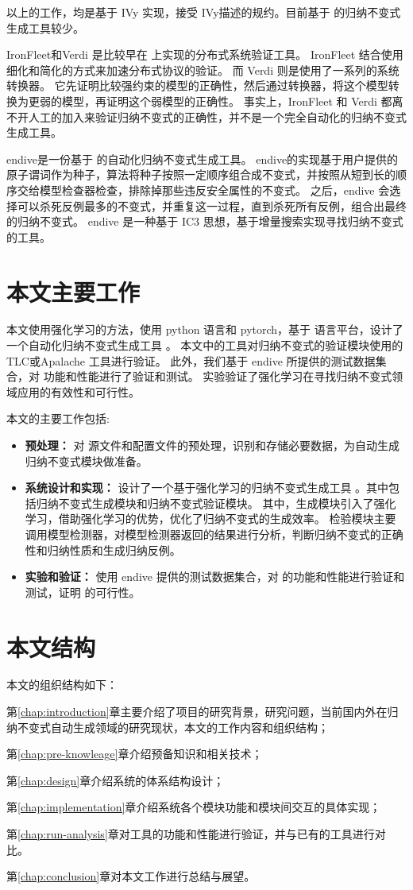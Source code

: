 以上的工作，均是基于 IVy 实现，接受 IVy描述的规约。目前基于 \TLA 的归纳不变式生成工具较少。

IronFleet\cite{IronFleet}和Verdi\cite{Verdi} 是比较早在 \TLA 上实现的分布式系统验证工具。
IronFleet 结合使用细化和简化的方式来加速分布式协议的验证。
而 Verdi 则是使用了一系列的系统转换器。
它先证明比较强约束的模型的正确性，然后通过转换器，将这个模型转换为更弱的模型，再证明这个弱模型的正确性。
事实上，IronFleet 和 Verdi 都离不开人工的加入来验证归纳不变式的正确性，并不是一个完全自动化的归纳不变式生成工具。

endive\cite{endive}是一份基于 \TLA 的自动化归纳不变式生成工具。
endive的实现基于用户提供的原子谓词作为种子，算法将种子按照一定顺序组合成不变式，并按照从短到长的顺序交给模型检查器检查，排除掉那些违反安全属性的不变式。
之后，endive 会选择可以杀死反例最多的不变式，并重复这一过程，直到杀死所有反例，组合出最终的归纳不变式。
endive 是一种基于 IC3 思想，基于增量搜索实现寻找归纳不变式的工具。

\section{本文主要工作}

本文使用强化学习的方法，使用 python 语言和 pytorch，基于 \TLA 语言平台，设计了一个自动化归纳不变式生成工具 \rltla。
本文中的工具对归纳不变式的验证模块使用的 TLC或Apalache 工具进行验证。
此外，我们基于 endive 所提供的测试数据集合，对 \rltla 功能和性能进行了验证和测试。
实验验证了强化学习在寻找归纳不变式领域应用的有效性和可行性。

本文的主要工作包括:
\begin{itemize}
    \item \textbf{预处理：} 对 \TLA 源文件和配置文件的预处理，识别和存储必要数据，为自动生成归纳不变式模块做准备。
    \item \textbf{系统设计和实现：} 设计了一个基于强化学习的归纳不变式生成工具 \rltla。其中包括归纳不变式生成模块和归纳不变式验证模块。
    其中，生成模块引入了强化学习，借助强化学习的优势，优化了归纳不变式的生成效率。
    检验模块主要调用模型检测器，对模型检测器返回的结果进行分析，判断归纳不变式的正确性和归纳性质和生成归纳反例。
    \item \textbf{实验和验证：} 使用 endive 提供的测试数据集合，对 \rltla 的功能和性能进行验证和测试，证明 \rltla 的可行性。
\end{itemize}

\section{本文结构}
本文的组织结构如下：

第\ref{chap:introduction}章主要介绍了项目的研究背景，研究问题，当前国内外在归纳不变式自动生成领域的研究现状，本文的工作内容和组织结构；

第\ref{chap:pre-knowleage}章介绍预备知识和相关技术；

第\ref{chap:design}章介绍系统的体系结构设计；

第\ref{chap:implementation}章介绍系统各个模块功能和模块间交互的具体实现；

第\ref{chap:run-analysis}章对工具的功能和性能进行验证，并与已有的工具进行对比。

第\ref{chap:conclusion}章对本文工作进行总结与展望。

